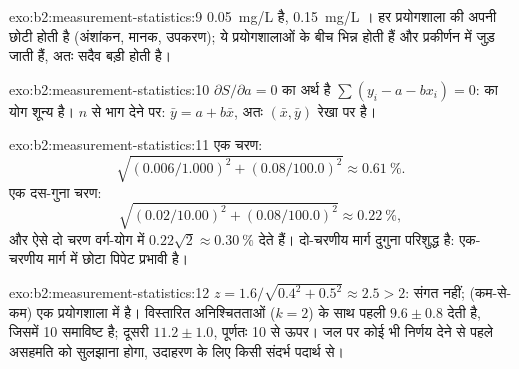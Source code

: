 \begin{solution}{exo:b2:measurement-statistics:9}
\qty{0.05}{mg/L}  है, \qty{0.15}{mg/L} । हर प्रयोगशाला की अपनी
छोटी  होती है (अंशांकन, मानक, उपकरण); ये  प्रयोगशालाओं के बीच भिन्न होती हैं और
प्रकीर्णन में जुड़ जाती हैं, अतः  सदैव बड़ी होती है।
\end{solution}

\begin{solution}{exo:b2:measurement-statistics:10}
$\partial S/\partial a = 0$ का अर्थ है $\sum(y_i - a - bx_i) = 0$:  का योग शून्य है।
$n$ से भाग देने पर: $\bar y = a + b\bar x$, अतः $(\bar x, \bar y)$ रेखा पर है।
\end{solution}

\begin{solution}{exo:b2:measurement-statistics:11}
एक चरण:
\[\sqrt{(0.006/1.000)^2 + (0.08/100.0)^2} \approx 0.61~\%.\]
एक दस-गुना चरण:
\[\sqrt{(0.02/10.00)^2 + (0.08/100.0)^2} \approx 0.22~\%,\]
और ऐसे दो चरण वर्ग-योग में $0.22\sqrt2 \approx 0.30~\%$ देते हैं। दो-चरणीय मार्ग दुगुना परिशुद्ध है: एक-चरणीय मार्ग में
छोटा पिपेट प्रभावी है।
\end{solution}

\begin{solution}{exo:b2:measurement-statistics:12}
$z = 1.6/\sqrt{0.4^2 + 0.5^2} \approx 2.5 > 2$: संगत नहीं; (कम-से-कम) एक प्रयोगशाला में  है।
विस्तारित अनिश्चितताओं ($k = 2$) के साथ पहली $9.6 \pm 0.8$ देती है, जिसमें 10 समाविष्ट है; दूसरी
$11.2 \pm 1.0$, पूर्णतः 10 से ऊपर। जल पर कोई भी निर्णय देने से पहले असहमति को सुलझाना होगा,
उदाहरण के लिए किसी संदर्भ पदार्थ से।
\end{solution}

